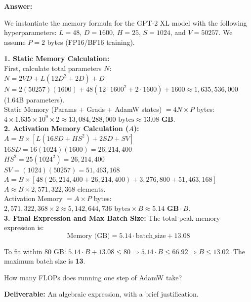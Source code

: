 \begin{answerbox}
    \textbf{Answer:}

    We instantiate the memory formula for the GPT-2 XL model with the following hyperparameters: $L=48$, $D=1600$, $H=25$, $S=1024$, and $V=50257$. We assume $P=2$ bytes (FP16/BF16 training).

    \textbf{1. Static Memory Calculation:} \\
    First, calculate total parameters $N$:\\
    $N = 2VD + L(12D^2 + 2D) + D$\\
    $N = 2(50257)(1600) + 48(12 \cdot 1600^2 + 2 \cdot 1600) + 1600 \approx 1,635,536,000$ (1.64B parameters).\\
    Static Memory (Params + Grads + AdamW states) $= 4N \times P$ bytes:\\
    $4 \times 1.635 \times 10^9 \times 2 \approx 13,084,288,000 \text{ bytes} \approx \mathbf{13.08 \text{ GB}}$.\\

    \textbf{2. Activation Memory Calculation ($A$):} \\
    $A = B \times [L(16SD + HS^2) + 2SD + SV]$\\
    $16SD = 16(1024)(1600) = 26,214,400$\\
    $HS^2 = 25(1024^2) = 26,214,400$\\
    $SV = (1024)(50257) = 51,463,168$\\
    $A = B \times [48(26,214,400 + 26,214,400) + 3,276,800 + 51,463,168]$\\
    $A \approx B \times 2,571,322,368 \text{ elements}$.\\
    Activation Memory $= A \times P$ bytes:\\
    $2,571,322,368 \times 2 \approx 5,142,644,736 \text{ bytes} \times B \approx \mathbf{5.14 \text{ GB}} \cdot B$.\\

    \textbf{3. Final Expression and Max Batch Size:}
    The total peak memory expression is:
    $$ \text{Memory (GB)} = 5.14 \cdot \text{batch\_size} + 13.08 $$

    To fit within 80 GB:
    $5.14 \cdot B + 13.08 \le 80 \Rightarrow 5.14 \cdot B \le 66.92 \Rightarrow B \le 13.02$.
    The maximum batch size is \textbf{13}.

\end{answerbox}

\begin{questionbox}
    How many FLOPs does running one step of AdamW take?

    \textbf{Deliverable:} An algebraic expression, with a brief justification.
\end{questionbox}

